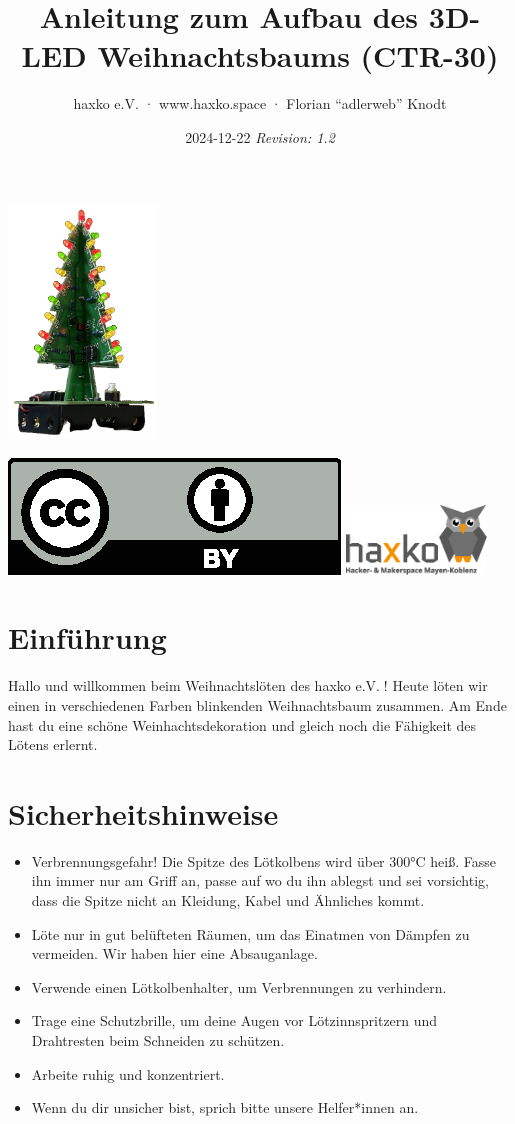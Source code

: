 \documentclass[10pt]{article}
\title{Anleitung zum Aufbau des 3D-LED Weihnachtsbaums (CTR-30)}
\author{haxko e.V. · www.haxko.space · Florian \enquote{adlerweb} Knodt}
\date{2024-12-22 \textit{Revision: 1.2}}
\begin{document}
	
	\maketitle
	\begin{center}
		\includegraphics[width=0.3\textwidth]{tree.png}
		
		\includegraphics[]{by.eps}
		\includegraphics[width=0.28\textwidth]{haxko-logo.eps}
	\end{center}
	
	\section{Einführung}
	Hallo und willkommen beim Weihnachtslöten des haxko e.V.🦉! Heute löten wir einen in verschiedenen Farben blinkenden Weihnachtsbaum zusammen. Am Ende hast du eine schöne Weinhachtsdekoration und gleich noch die Fähigkeit des Lötens erlernt.
	
	\section{Sicherheitshinweise}
	\begin{itemize}
		\item Verbrennungsgefahr! Die Spitze des Lötkolbens wird über 300°C heiß. Fasse ihn immer nur am Griff an, passe auf wo du ihn ablegst und sei vorsichtig, dass die Spitze nicht an Kleidung, Kabel und Ähnliches kommt.
		\item Löte nur in gut belüfteten Räumen, um das Einatmen von Dämpfen zu vermeiden. Wir haben hier eine Absauganlage.
		\item Verwende einen Lötkolbenhalter, um Verbrennungen zu verhindern.
		\item Trage eine Schutzbrille, um deine Augen vor Lötzinnspritzern und Drahtresten beim Schneiden zu schützen.
		\item Arbeite ruhig und konzentriert.
		\item Wenn du dir unsicher bist, sprich bitte unsere Helfer*innen an.
	\end{itemize}
	
\end{document}
